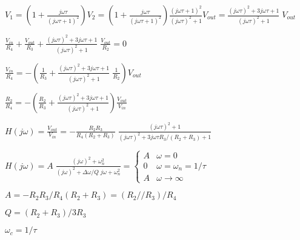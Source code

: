 \documentclass{article}
\def\lthtmlcheckvsize{\ifdim\ht\sizebox<\vsize 
  \ifdim\wd\sizebox<\hsize\expandafter\hfill\fi \expandafter\vfill
  \else\expandafter\vss\fi}%
\begin{document}
{\newpage\clearpage
{}%
$\displaystyle V_1=\left(1+\frac{j\omega\tau}{(j\omega\tau+1)^2}\right)V_2
=\left(1+\frac{j\omega\tau}{(j\omega\tau+1)^2}\right)\frac{(j\omega\tau+1)^2}{(j\omega\tau)^2+1}V_{out}
=\frac{(j\omega\tau)^2+3j\omega\tau+1}{(j\omega\tau)^2+1}\;V_{out}
$%
\lthtmlindisplaymathZ
\lthtmlcheckvsize\clearpage}

{\newpage\clearpage
{}%
$\displaystyle \frac{V_{in}}{R_4}+\frac{V_{out}}{R_3}
+\frac{(j\omega\tau)^2+3j\omega\tau+1}{(j\omega\tau)^2+1}\;\frac{V_{out}}{R_2}=0
$%
\lthtmlindisplaymathZ
\lthtmlcheckvsize\clearpage}

{\newpage\clearpage
{}%
$\displaystyle \frac{V_{in}}{R_4}=-\left(\frac{1}{R_3}
+\frac{(j\omega\tau)^2+3j\omega\tau+1}{(j\omega\tau)^2+1}\;\frac{1}{R_2}\right)V_{out}
$%
\lthtmlindisplaymathZ
\lthtmlcheckvsize\clearpage}

{\newpage\clearpage
{}%
$\displaystyle \frac{R_2}{R_4}=-\left(\frac{R_2}{R_3}
+\frac{(j\omega\tau)^2+3j\omega\tau+1}{(j\omega\tau)^2+1}\right)
\frac{V_{out}}{V_{in}}
$%
\lthtmlindisplaymathZ
\lthtmlcheckvsize\clearpage}

{\newpage\clearpage
{}%
$\displaystyle H(j\omega)=\frac{V_{out}}{V_{in}}
=-\frac{R_2R_3}{R_4(R_2+R_3)}\;\frac{(j\omega\tau)^2+1}{(j\omega\tau)^2+3j\omega\tau R_3/(R_2+R_3)+1}
$%
\lthtmlindisplaymathZ
\lthtmlcheckvsize\clearpage}

{\newpage\clearpage
{}%
$\displaystyle H(j\omega)=A\;\frac{(j\omega)^2+\omega_n^2}{(j\omega)^2+\Delta\omega/Q\;j\omega+\omega_n^2}
=\left\{\begin{array}{ll}A&\omega=0\\0&\omega=\omega_n=1/\tau
\\A&\omega\rightarrow\infty\end{array}\right.
$%
\lthtmlindisplaymathZ
\lthtmlcheckvsize\clearpage}

{\newpage\clearpage
{}%
$A=-R_2R_3/R_4(R_2+R_3)=(R_2//R_3)/R_4$%
\lthtmlindisplaymathZ
\lthtmlcheckvsize\clearpage}

{\newpage\clearpage
{}%
$Q=(R_2+R_3)/3R_3$%
\lthtmlindisplaymathZ
\lthtmlcheckvsize\clearpage}

{\newpage\clearpage
{}%
$\omega_c=1/\tau$%
\lthtmlindisplaymathZ
\lthtmlcheckvsize\clearpage}
\end{document}
